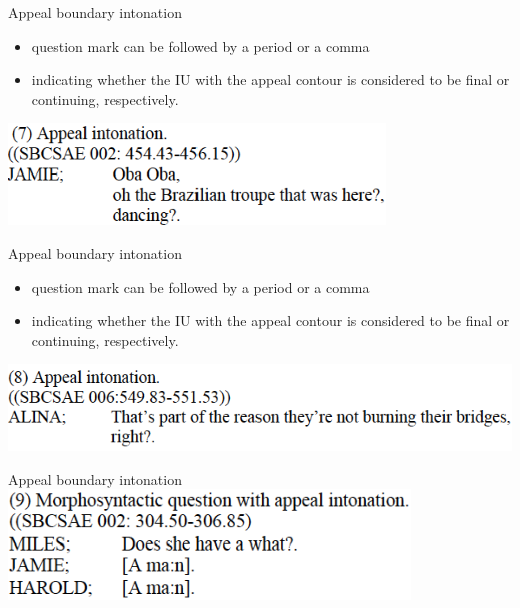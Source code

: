 \documentclass[compress,12pt]{beamer}%
\begin{document}
  \begin{frame}{Appeal boundary intonation}
    \begin{itemize}
        \item question mark can be followed by a period or a comma 
        \item indicating whether the IU with the appeal contour is considered to be final or continuing, respectively.  
    \end{itemize}  
    \hfill\includegraphics[width=0.75\textwidth]{images/Appeal_Ex7.png}\\
    \hfill{}
  \end{frame}

  \begin{frame}{Appeal boundary intonation}
    \begin{itemize}
        \item question mark can be followed by a period or a comma 
        \item indicating whether the IU with the appeal contour is considered to be final or continuing, respectively.  
    \end{itemize}  
    \hfill\includegraphics[width=1\textwidth]{images/Appeal_Ex8.png}\\
    \hfill{}
  \end{frame}
  
  \begin{frame}{Appeal boundary intonation}
    \includegraphics[width=0.8\textwidth]{images/Appeal_Ex9.png}\\
  \end{frame}
  
\end{document}
